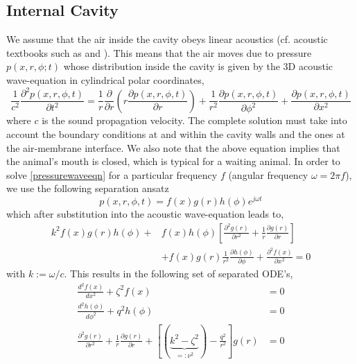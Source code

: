 \subsection{Internal Cavity}\label{internalcavity}
We assume that the air inside the cavity obeys linear acoustics (cf. acoustic textbooks such as \cite[p.~313]{rschevkinsound} and \cite[p.~247]{temkinelements} ). 
This means that the air moves due to pressure $p(x,r,\phi;t)$ whose distribution inside the cavity
is given by the $3$D acoustic wave-equation in cylindrical polar coordinates,	
\begin{equation}\label{pressurewaveeqn}
 \frac{1}{c^2}\frac{\partial^2 p(x,r,\phi,t)}{\partial t^2}=\frac{1}{r}\frac{\partial}{\partial r}\left(r\frac{\partial p(x,r,\phi,t)}{\partial r}\right)
 +\frac{1}{r^2}\frac{\partial p(x,r,\phi,t)}{\partial \phi^2}+\frac{\partial p(x,r,\phi,t)}{\partial x^2}
\end{equation}
where $c$ is the sound propagation velocity. The complete solution must take into account the boundary conditions at and within the cavity walls and the
ones at the air-membrane interface. We also note that the above equation implies that the animal's mouth is closed, which is typical for a waiting
animal. In order to solve \eqref{pressurewaveeqn} for a particular frequency $f$ (angular frequency $\omega=2\pi f$), we use the following
separation ansatz
\begin{equation}\label{pseparationansatz}
  p(x,r,\phi,t)=f(x)g(r)h(\phi)e^{j\omega t}
\end{equation}
which after substitution into the acoustic wave-equation leads to,
\begin{equation}\label{pseparationansatz2}
\begin{split}
 k^2f(x)g(r)h(\phi)+&f(x)h(\phi)\left[\frac{\partial^2 g(r)}{\partial r^2} + \frac{1}{r}\frac{\partial g(r)}{\partial r}\right] \\
 &+f(x)g(r)\frac{1}{r^2}\frac{\partial h(\phi)}{\partial \phi}+\frac{\partial^2 f(x)}{\partial x^2}=0
\end{split}
\end{equation}
with $k:=\omega/c$. This results in the following set of separated ODE's,
\begin{align}
 \frac{d^2 f(x)}{dx^2}+\zeta^2f(x)&=0\\
 \frac{d^2 h(\phi)}{d\phi^2}+q^2h(\phi	)&=0\\
 \frac{\partial^2 g(r)}{\partial r^2} + \frac{1}{r}\frac{\partial g(r)}{\partial r}+\left[(\displaystyle\underbrace{k^2-\zeta^2}_{=:\nu^2})-\frac{q^2}{r^2}\right]g(r)&=0\label{besselequation1}
\end{align}
